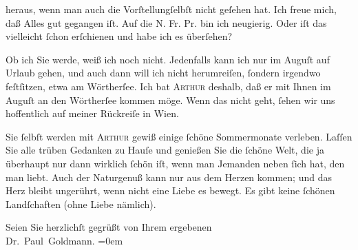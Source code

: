                heraus, wenn man auch die Vorſtellungſelbſt nicht geſehen hat. Ich freue mich, daß Alles gut gegangen
               iſt. Auf die N. Fr. Pr. bin ich neugierig. Oder
               iſt das \label{K_L03527-3v}\label{K_L03527-3} vielleicht{ }ſchon erſchienen und habe
               ich es überſehen?\pend
           
\pstart
           Ob ich Sie \label{K_L03527-4v}\label{K_L03527-4} werde, weiß ich noch nicht. Jedenfalls kann ich nur im Auguſt auf Urlaub gehen, {\pb}und auch dann
               will ich nicht herumreiſen,{ }ſondern irgendwo feſtſitzen, etwa am Wörtherſee. Ich bat \textsc{Arthur}{ } deshalb, daß er mit Ihnen im Auguſt an den Wörtherſee
               kommen möge. Wenn das nicht geht,{ }ſehen wir uns hoffentlich auf meiner Rückreiſe in
                  Wien.\pend
           
\pstart
           Sie{ }ſelbſt werden mit \textsc{Arthur} gewiß einige{ }ſchöne {\pb}Sommermonate verleben.
               Laſſen Sie alle trüben Gedanken zu Hauſe und genießen Sie die{ }ſchöne Welt, die ja
               überhaupt nur dann wirklich{ }ſchön iſt, wenn man Jemanden neben{ }ſich hat, den man  liebt. Auch der Naturgenuß kann nur aus dem Herzen
               kommen; und das Herz bleibt ungerührt, wenn nicht eine Liebe es bewegt. Es gibt keine{ }ſchönen Landſchaften (ohne Liebe nämlich).\pend
           
\pstart
           Seien Sie herzlichſt gegrüßt von Ihrem ergebenen {\\[\baselineskip]}\spacefill\mbox{Dr. Paul Goldmann.}\pend
           \leftskip=0em{}\endnumbering{}  \newcommand{\dateiname}{L03527}\newcommand{\titel}{Paul Goldmann an Olga Gussmann, 10. 5. [1901]}\newcommand{\editorInnen}{Martin Anton Müller und Laura Untner}
